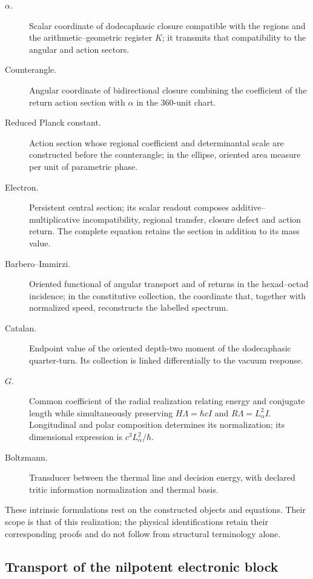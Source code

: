 \begin{description}
 \item[$\alpha$.] Scalar coordinate of dodecaphasic closure compatible with
 the regions and the arithmetic--geometric register $K$; it transmits that
 compatibility to the angular and action sectors.
 \item[Counterangle.] Angular coordinate of bidirectional closure combining
 the coefficient of the return action section with $\alpha$ in the
 $360$-unit chart.
 \item[Reduced Planck constant.] Action section whose regional coefficient
 and determinantal scale are constructed before the counterangle; in the
 ellipse, oriented area measure per unit of parametric phase.
 \item[Electron.] Persistent central section; its scalar readout composes
 additive--multiplicative incompatibility, regional transfer, closure defect
 and action return. The complete equation retains the section in addition
 to its mass value.
 \item[Barbero--Immirzi.] Oriented functional of angular transport and of
 returns in the hexad--octad incidence; in the constitutive collection, the
 coordinate that, together with normalized speed, reconstructs the labelled
 spectrum.
 \item[Catalan.] Endpoint value of the oriented depth-two moment of the
 dodecaphasic quarter-turn. Its collection is linked differentially to the
 vacuum response.
 \item[$G$.] Common coefficient of the radial realization relating
 energy and conjugate length while simultaneously preserving
 $H\Lambda=\hbar cI$ and $R\Lambda=L_\alpha^2I$.
 Longitudinal and polar composition determines its normalization;
 its dimensional expression is $c^3L_\alpha^2/\hbar$.
 \item[Boltzmann.] Transducer between the thermal line and decision energy,
 with declared tritic information normalization and thermal basis.
\end{description}
These intrinsic formulations rest on the constructed objects and equations.
Their scope is that of this realization; the physical identifications
retain their corresponding proofs and do not follow from structural
terminology alone.

\subsection{Transport of the nilpotent electronic block}
\label{md:compos:nilpotentes}

